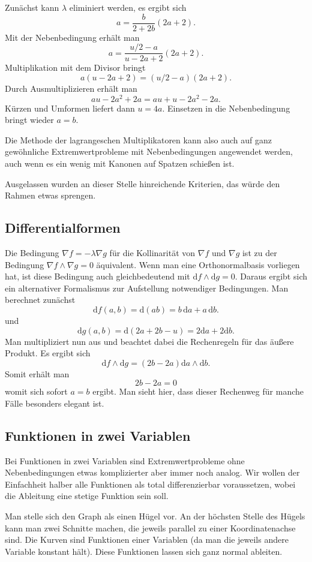 \documentclass[a4paper,11pt,fleqn,twocolumn]{article}
\begin{document}
Zunächst kann \(\lambda\) eliminiert werden, es ergibt sich
\[a=\frac{b}{2+2b}(2a+2).\]
Mit der Nebenbedingung erhält man
\[a=\frac{u/2-a}{u-2a+2}(2a+2).\]
Multiplikation mit dem Divisor bringt
\[a(u-2a+2)=(u/2-a)(2a+2).\]
Durch Ausmultiplizieren erhält man
\[au-2a^2+2a = au+u-2a^2-2a.\]
Kürzen und Umformen liefert dann \(u=4a\). Einsetzen
in die Nebenbedingung bringt wieder \(a=b\).

Die Methode der lagrangeschen Multiplikatoren kann also auch auf
ganz gewöhnliche Extremwertprobleme mit Nebenbedingungen angewendet
werden, auch wenn es ein wenig mit Kanonen auf Spatzen schießen ist.

Ausgelassen wurden an dieser Stelle hinreichende Kriterien,
das würde den Rahmen etwas sprengen.

\subsection*{Differentialformen}

Die Bedingung \(\nabla f=-\lambda\nabla g\) für die Kollinarität von \(\nabla f\) und \(\nabla g\) ist zu der Bedingung \(\nabla f\wedge\nabla g=0\) äquivalent. Wenn man eine Orthonormalbasis vorliegen hat, ist diese Bedingung auch gleichbedeutend mit \(\mathrm df\wedge\mathrm dg=0\).
Daraus ergibt sich ein alternativer Formalismus
zur Aufstellung notwendiger Bedingungen. Man berechnet zunächst
\[\mathrm df(a,b) = \mathrm d(ab) = b\,\mathrm da+a\,\mathrm db.\]
und
\[\mathrm dg(a,b) = \mathrm d(2a+2b-u) = 2\mathrm da+2\mathrm db.\]
Man multipliziert nun aus und beachtet dabei die Rechenregeln
für das äußere Produkt. Es ergibt sich
\[\mathrm df\wedge\mathrm dg
= (2b-2a)\mathrm da\wedge\mathrm db.\]
Somit erhält man
\[2b-2a=0\]
womit sich sofort \(a=b\) ergibt. Man sieht hier, dass dieser Rechenweg für manche Fälle besonders elegant ist.

\subsection*{Funktionen in zwei Variablen}

Bei Funktionen in zwei Variablen sind Extremwertprobleme ohne
Nebenbedingungen etwas komplizierter aber immer noch analog.
Wir wollen der Einfachheit halber alle Funktionen als
total differenzierbar voraussetzen, wobei die Ableitung
eine stetige Funktion sein soll.

Man stelle sich den Graph
als einen Hügel vor. An der höchsten Stelle des Hügels kann man
zwei Schnitte machen, die jeweils parallel zu einer Koordinatenachse
sind. Die Kurven sind Funktionen einer Variablen (da man
die jeweils andere Variable konstant hält). Diese Funktionen lassen
sich ganz normal ableiten.
\end{document}
